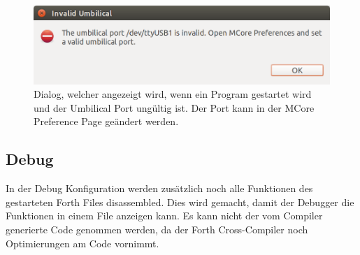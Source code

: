 \begin{figure}[H]
	\centering
		\includegraphics[scale=0.4]{launch/invalidumbilical.png}
		\caption{Dialog, welcher angezeigt wird, wenn ein Program gestartet wird und der Umbilical Port ungültig ist. Der Port kann in der MCore Preference Page geändert werden.}
		\label{fig:invalidumbilical}
\end{figure}

\subsection{Debug}

In der Debug Konfiguration werden zusätzlich noch alle Funktionen des gestarteten Forth Files disassembled. Dies wird gemacht, damit der Debugger die Funktionen in einem File anzeigen kann. Es kann nicht der vom Compiler generierte Code genommen werden, da der Forth Cross-Compiler noch Optimierungen am Code vornimmt.

